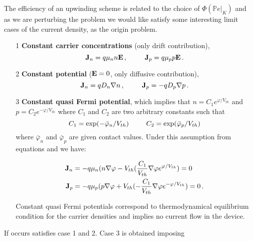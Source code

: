 %
The efficiency of an upwinding scheme is related to the choice of $\Phi(\mathbb{P}e|_K)$ and as we are perturbing the problem we would like satisfy some interesting limit cases of the current density, as the origin problem.
\begin{itemize}
\item[1] \textbf{Constant carrier concentrations} (only drift contribution),
\begin{equation*}
\vect{J}_n  = q\mu_n n \vect{E}\, , \psp{15} \vect{J}_p  = q\mu_p p \vect{E} \, .
\end{equation*}
\item[2] \textbf{Constant potential} ($\mathbf{E}=0$, only diffusive contribution),
\begin{equation*}
\vect{J}_n  = qD_n\nabla n \, , \psp{15} \vect{J}_p  = -qD_p\nabla p \, .
\end{equation*}
\item[3] \textbf{Constant quasi Fermi potential}, which implies that $n=C_1e^{\varphi / V_{th}}$ and $p=C_2e^{-\varphi / V_{th}}$ where $C_1$ and $C_2$ are two arbitrary constants such that
\begin{equation*}
C_1 = \exp(-\bar\varphi_n/V_{th}) \psp{15} C_2 = \exp(\bar\varphi_p/V_{th})
\end{equation*}
where $\bar\varphi_n$ and $\bar\varphi_p$ are given contact values. Under this assumption from equations  and  we have:

\begin{align*}
\mathbf{J}_n & = -q\mu_n (n\nabla 	\varphi - V_{th} (\dfrac{C_1}{V_{th}}\nabla \varphi e^{\varphi / V_{th}}) = 0\\
\mathbf{J}_p & = -q\mu_p (p\nabla 	\varphi + V_{th} (-\dfrac{C_1}{V_{th}}\nabla \varphi e^{-\varphi / V_{th}}) = 0 \, .
\end{align*}
 
Constant quasi Fermi potentials correspond to thermodynamical equilibrium condition for the carrier densities and implies no current flow in the device.
\end{itemize}

If  occurs  satisfies case 1 and 2. Case 3 is obtained imposing

